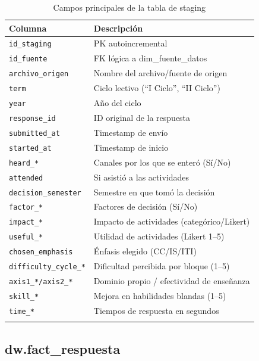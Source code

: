 \documentclass[12pt, letterpaper]{article}
\begin{document}
\begin{longtable}{lp{8cm}}
\toprule
\textbf{Columna} & \textbf{Descripción} \\
\midrule
\endhead
\texttt{id\_staging} & PK autoincremental \\
\texttt{id\_fuente} & FK lógica a dim\_fuente\_datos \\
\texttt{archivo\_origen} & Nombre del archivo/fuente de origen \\
\texttt{term} & Ciclo lectivo (``I Ciclo'', ``II Ciclo'') \\
\texttt{year} & Año del ciclo \\
\texttt{response\_id} & ID original de la respuesta \\
\texttt{submitted\_at} & Timestamp de envío \\
\texttt{started\_at} & Timestamp de inicio \\
\texttt{heard\_*} & Canales por los que se enteró (Sí/No) \\
\texttt{attended} & Si asistió a las actividades \\
\texttt{decision\_semester} & Semestre en que tomó la decisión \\
\texttt{factor\_*} & Factores de decisión (Sí/No) \\
\texttt{impact\_*} & Impacto de actividades (categórico/Likert) \\
\texttt{useful\_*} & Utilidad de actividades (Likert 1--5) \\
\texttt{chosen\_emphasis} & Énfasis elegido (CC/IS/ITI) \\
\texttt{difficulty\_cycle\_*} & Dificultad percibida por bloque (1--5) \\
\texttt{axis1\_*/axis2\_*} & Dominio propio / efectividad de enseñanza \\
\texttt{skill\_*} & Mejora en habilidades blandas (1--5) \\
\texttt{time\_*} & Tiempos de respuesta en segundos \\
\bottomrule
\caption{Campos principales de la tabla de staging}
\end{longtable}

\subsection{dw.fact\_respuesta}
\end{document}
